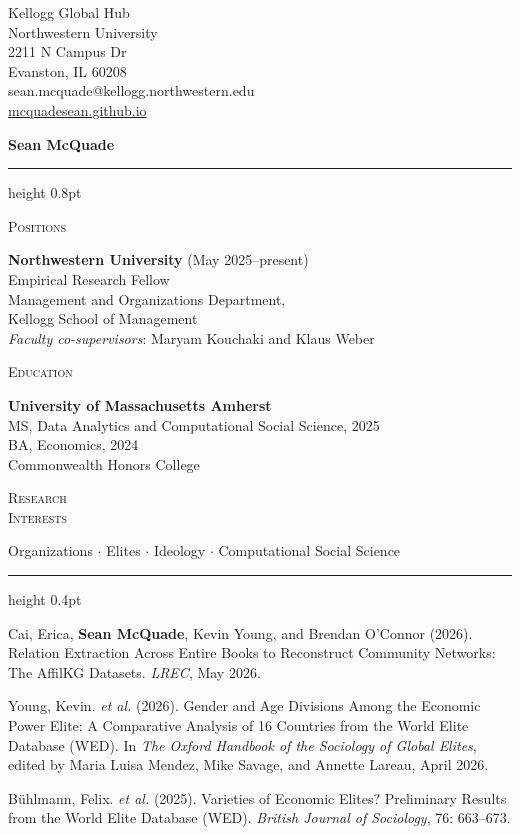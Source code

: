 \documentclass[11pt]{article}
\newcommand{\cvsection}[1]{%
  \vspace{8pt}\par
  \noindent
  \begin{minipage}[t]{1.25in}%
    {\small\textsc{#1}}%
  \end{minipage}\hspace{0.15in}%
  \begin{minipage}[t]{5.4in}%
}
\newcommand{\cvend}{%
  \end{minipage}\par%
}
\newcommand{\cvsectionflow}[1]{%
  \vspace{8pt}\par
  \leftskip=1.4in\relax
  \noindent
  \llap{\smash{\begin{minipage}[t]{1.25in}%
    {\small\textsc{#1}}%
  \end{minipage}}\hspace{0.15in}}%
  \ignorespaces
}
\newcommand{\cvendflow}{%
  \par\leftskip=0pt\relax
}
\newcommand{\bibfirst}{\hangindent=12pt\hangafter=1\relax\ignorespaces}
\newcommand{\bibnext}{\par\vspace{4pt}\hangindent=12pt\hangafter=1\noindent\ignorespaces}
\begin{document}
\begin{flushright}
Kellogg Global Hub\\
Northwestern University\\
2211 N Campus Dr\\
Evanston, IL 60208\\
sean.mcquade@kellogg.northwestern.edu\\
\href{https://mcquadesean.github.io/}{mcquadesean.github.io}
\end{flushright}

\vspace{4pt}

{\large \textbf{Sean McQuade}}

\vspace{2pt}
\hrule height 0.8pt
\vspace{2pt}

\cvsection{Positions}
\textbf{Northwestern University} (May 2025--present)\\
\hspace*{12pt}Empirical Research Fellow\\
\hspace*{12pt}Management and Organizations Department,\\
\hspace*{12pt}Kellogg School of Management\\
\hspace*{12pt}\textit{Faculty co-supervisors}: Maryam Kouchaki and Klaus Weber
\cvend

\cvsection{Education}
\textbf{University of Massachusetts Amherst}\\
\hspace*{12pt}MS, Data Analytics and Computational Social Science, 2025\\
\hspace*{12pt}BA, Economics, 2024\\
\hspace*{24pt}Commonwealth Honors College
\cvend

\cvsection{Research\\Interests}
Organizations $\cdot$ Elites $\cdot$ Ideology $\cdot$ Computational Social Science
\cvend

\vspace{4pt}
\hrule height 0.4pt

\cvsectionflow{Publications}
\bibfirst
Cai, Erica, \textbf{Sean McQuade}, Kevin Young, and Brendan O'Connor (2026). Relation Extraction Across Entire Books to Reconstruct Community Networks: The AffilKG Datasets. \textit{LREC}, May 2026.
\bibnext
Young, Kevin. \textit{et al.} (2026). Gender and Age Divisions Among the Economic Power Elite: A Comparative Analysis of 16 Countries from the World Elite Database (WED). In \textit{The Oxford Handbook of the Sociology of Global Elites}, edited by Maria Luisa Mendez, Mike Savage, and Annette Lareau, April 2026.
\bibnext
B\"uhlmann, Felix. \textit{et al.} (2025). Varieties of Economic Elites? Preliminary Results from the World Elite Database (WED). \textit{British Journal of Sociology}, 76: 663--673.
\cvendflow
\end{document}
